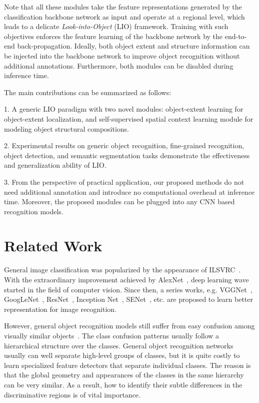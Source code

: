 \documentclass[10pt,twocolumn,letterpaper]{article}
\begin{document}
Note that all these modules take the feature representations generated by the classification backbone network as input and operate at a regional level, which leads to a delicate \textit{Look-into-Object} (LIO) framework. Training with such objectives enforces the feature learning of the backbone network by the end-to-end back-propagation. Ideally, both object extent and structure information can be injected into the backbone network to improve object recognition without additional annotations. Furthermore, both modules can be disabled during inference time.

The main contributions can be summarized as follows:

1. A generic LIO paradigm with two novel modules: object-extent learning for object-extent localization, and self-supervised spatial context learning module for modeling object structural compositions.

2. Experimental results on generic object recognition, fine-grained recognition, object detection, and semantic segmentation tasks demonstrate the effectiveness and generalization ability of LIO.

3. From the perspective of practical application, our proposed methods do not need additional annotation and introduce no computational overhead at inference time. Moreover, the proposed modules can be plugged into any CNN based recognition models.
\section{Related Work} \label{sec:related}

General image classification was popularized by the appearance of ILSVRC~\cite{ILSVRC}. With the extraordinary improvement achieved by AlexNet~\cite{AlexNet}, deep learning wave started in the field of computer vision. Since then, a series works, e.g. VGGNet~\cite{VGGNet}, GoogLeNet~\cite{inception}, ResNet~\cite{resnet}, Inception Net~\cite{inception, inceptionv2}, SENet~\cite{hu2018squeeze}, etc. are proposed to learn better representation for  image recognition.

However, general object recognition models still suffer from easy confusion among visually similar objects~\cite{bilal2018convolutional, deng2010what}. The class confusion patterns usually follow a hierarchical structure over the classes. General object recognition networks usually can well separate high-level groups of classes, but it is quite costly to learn specialized feature detectors that separate individual classes. The reason is that the global geometry and appearances of the classes in the same hierarchy can be very similar. As a result, how to identify their subtle differences in the discriminative regions is of vital importance.
\end{document}
